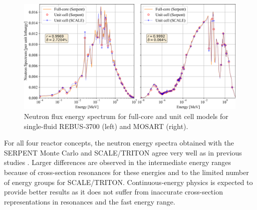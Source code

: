 \documentclass[letterpaper]{mandc2019}
\begin{document}
\begin{figure}[t!]
  \centering
  \includegraphics[width=\textwidth]{./Figures/rebus_mosart_spectrum.png}
  	  \vspace{-0.25in}
  \caption{Neutron flux energy spectrum for full-core and unit cell models for single-fluid REBUS-3700 (left) and \gls{MOSART} (right).}
  \label{fig:spectrum_rebus}
      \vspace{-0.5in}
\end{figure}
For all four reactor concepts, the neutron energy spectra obtained with the SERPENT Monte Carlo and SCALE/TRITON agree very well as in previous studies \cite{betzler_fuel_2018}. 
Larger differences are observed in the intermediate energy ranges because of cross-section resonances for these energies and to the limited number of energy groups for SCALE/TRITON. 
Continuous-energy physics is expected to provide better results as it does not suffer from inaccurate cross-section representations in resonances and the fast energy range. 
\end{document}
